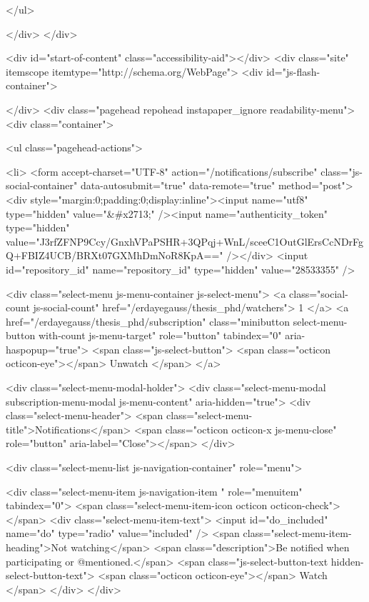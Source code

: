 </ul>


    
  </div>
</div>

        

        


      <div id="start-of-content" class="accessibility-aid"></div>
          <div class="site" itemscope itemtype="http://schema.org/WebPage">
    <div id="js-flash-container">
      
    </div>
    <div class="pagehead repohead instapaper_ignore readability-menu">
      <div class="container">
        
<ul class="pagehead-actions">

  <li>
      <form accept-charset="UTF-8" action="/notifications/subscribe" class="js-social-container" data-autosubmit="true" data-remote="true" method="post"><div style="margin:0;padding:0;display:inline"><input name="utf8" type="hidden" value="&#x2713;" /><input name="authenticity_token" type="hidden" value="J3rfZFNP9Ccy/GnxhVPaPSHR+3QPqj+WnL/sceeC1OutGlErsCcNDrFgQ+FBIZ4UCB/BRXt07GXMhDmNoR8KpA==" /></div>    <input id="repository_id" name="repository_id" type="hidden" value="28533355" />

      <div class="select-menu js-menu-container js-select-menu">
        <a class="social-count js-social-count" href="/erdayegauss/thesis_phd/watchers">
          1
        </a>
        <a href="/erdayegauss/thesis_phd/subscription"
          class="minibutton select-menu-button with-count js-menu-target" role="button" tabindex="0" aria-haspopup="true">
          <span class="js-select-button">
            <span class="octicon octicon-eye"></span>
            Unwatch
          </span>
        </a>

        <div class="select-menu-modal-holder">
          <div class="select-menu-modal subscription-menu-modal js-menu-content" aria-hidden="true">
            <div class="select-menu-header">
              <span class="select-menu-title">Notifications</span>
              <span class="octicon octicon-x js-menu-close" role="button" aria-label="Close"></span>
            </div>

            <div class="select-menu-list js-navigation-container" role="menu">

              <div class="select-menu-item js-navigation-item " role="menuitem" tabindex="0">
                <span class="select-menu-item-icon octicon octicon-check"></span>
                <div class="select-menu-item-text">
                  <input id="do_included" name="do" type="radio" value="included" />
                  <span class="select-menu-item-heading">Not watching</span>
                  <span class="description">Be notified when participating or @mentioned.</span>
                  <span class="js-select-button-text hidden-select-button-text">
                    <span class="octicon octicon-eye"></span>
                    Watch
                  </span>
                </div>
              </div>

